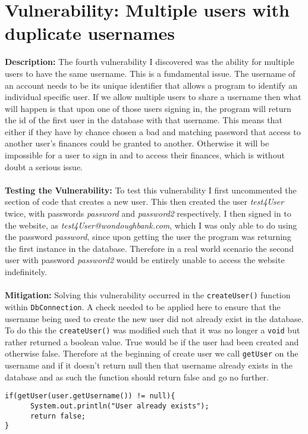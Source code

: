 \section{Vulnerability: Multiple users with duplicate usernames}
\label{sec:background}
\textbf{Description:} The fourth vulnerability I discovered was the ability for multiple users to have the same username. This is a fundamental issue. The username of an account
needs to be its unique identifier that allows a program to identify an individual specific user. If we allow multiple users to share a username then what will happen is that
upon one of those users signing in, the program will return the id of the first user in the database with that username. This means that either if they have by chance chosen a
bad and matching password that access to another user's finances could be granted to another. Otherwise it will be impossible for a user to sign in and to access their finances,
which is without doubt a serious issue.\\ \\
\textbf{Testing the Vulnerability:} To test this vulnerability I first uncommented the section of code that creates a new user. This then created the user \textit{test4User}
twice, with passwords \textit{password} and \textit{password2} respectively. I then signed in to the website, as \textit{test4User@wondoughbank.com}, which I was only able to
do using the password \textit{password}, since upon getting the user the program was returning the first instance in the database. Therefore in a real world scenario the second
user with password \textit{password2} would be entirely unable to access the website indefinitely.\\ \\
\textbf{Mitigation:} Solving this vulnerability occurred in the \verb|createUser()| function within \verb|DbConnection|. A check needed to be applied here to ensure that the
username being used to create the new user did not already exist in the database. To do this the \verb|createUser()| was modified such that it was no longer a \verb|void| but rather
returned a boolean value. True would be if the user had been created and otherwise false. Therefore at the beginning of create user we call \verb|getUser| on the username and
if it doesn't return null then that username already exists in the database and as such the function should return false and go no further.
\begin{verbatim}
if(getUser(user.getUsername()) != null){
      System.out.println("User already exists");
      return false;
}
\end{verbatim}

